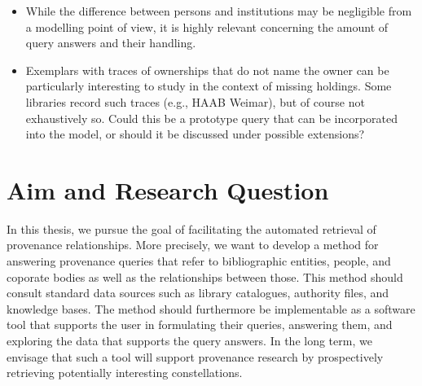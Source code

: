 %
\begin{itemize}
  \item
    While the difference between persons and institutions may be negligible
    from a modelling point of view, it is highly relevant concerning the
    amount of query answers and their handling.
  \item
    Exemplars with traces of ownerships that do not name the owner
    can be particularly interesting to study in the context of missing holdings.
    Some libraries record such traces (e.g., HAAB Weimar), but of course not exhaustively so.
    Could this be a prototype query that can be incorporated into the model,
    or should it be discussed under possible extensions?
\end{itemize}

\section{Aim and Research Question}
\label{sec:research_questions}

In this thesis, we pursue the goal of facilitating
the automated retrieval of provenance relationships.
More precisely,
we want to develop a method for answering provenance queries that refer to bibliographic entities, people, and coporate bodies
as well as the relationships between those. This method should consult standard data sources such as
library catalogues, authority files, and knowledge bases. The method should furthermore be implementable as a software tool
that supports the user in formulating their queries, answering them, and exploring the data that supports the query answers.
In the long term, we envisage that such a tool will support provenance research
by prospectively retrieving potentially interesting constellations.

